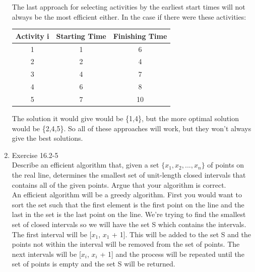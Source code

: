 \documentclass[12pt]{article}
\begin{document}
\begin{enumerate}
The last approach for selecting activities by the earliest start times will not always be the most efficient either. In the case if there were these activities:

\begin{center}
 \begin{tabular}{||c c c||} 
 \hline
 Activity i & Starting Time & Finishing Time\\ [0.5ex] 
 \hline
 1 & 1 & 6\\ 
 \hline
 2 & 2 & 4\\
 \hline
 3 & 4 & 7\\
 \hline
 4 & 6 & 8\\
 \hline
 5 & 7 & 10 \\
 \hline
\end{tabular}
\end{center}

The solution it would give would be \{1,4\}, but the more optimal solution would be \{2,4,5\}. So all of these approaches will work, but they won't always give the best solutions.

\item Exercise 16.2-5 \\ 
Describe an efficient algorithm that, given a set $\{x_1, x_2, ... , x_n\}$ of points on the real line, determines the smallest set of unit-length closed intervals that contains all of the given points. Argue that your algorithm is correct. \\

An efficient algorithm will be a greedy algorithm. First you would want to sort the set such that the first element is the first point on the line and the last in the set is the last point on the line. We're trying to find the smallest set of closed intervals so we will have the set S which contains the intervals. The first interval will be [$x_1$, $x_1$ + 1]. This will be added to the set S and the points not within the interval will be removed from the set of points. The next intervals will be [$x_i$, $x_i$ + 1] and the process will be repeated until the set of points is empty and the set S will be returned. 


\end{enumerate}
\end{document}
